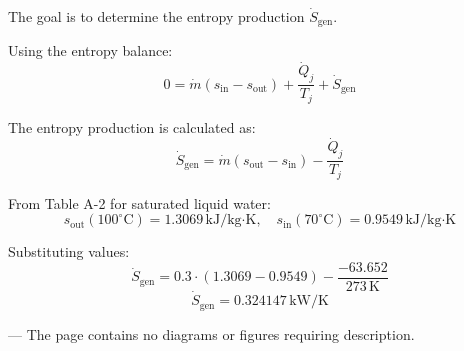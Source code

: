 The goal is to determine the entropy production \( \dot{S}_{\text{gen}} \).  

Using the entropy balance:  
\[
0 = \dot{m} (s_{\text{in}} - s_{\text{out}}) + \frac{\dot{Q}_j}{T_j} + \dot{S}_{\text{gen}}
\]  

The entropy production is calculated as:  
\[
\dot{S}_{\text{gen}} = \dot{m} (s_{\text{out}} - s_{\text{in}}) - \frac{\dot{Q}_j}{T_j}
\]  

From Table A-2 for saturated liquid water:  
\[
s_{\text{out}}(100^\circ\text{C}) = 1.3069 \, \text{kJ/kg·K}, \quad s_{\text{in}}(70^\circ\text{C}) = 0.9549 \, \text{kJ/kg·K}
\]  

Substituting values:  
\[
\dot{S}_{\text{gen}} = 0.3 \cdot (1.3069 - 0.9549) - \frac{-63.652}{273 \, \text{K}}
\]  
\[
\dot{S}_{\text{gen}} = 0.324147 \, \text{kW/K}
\]  

---  
The page contains no diagrams or figures requiring description.